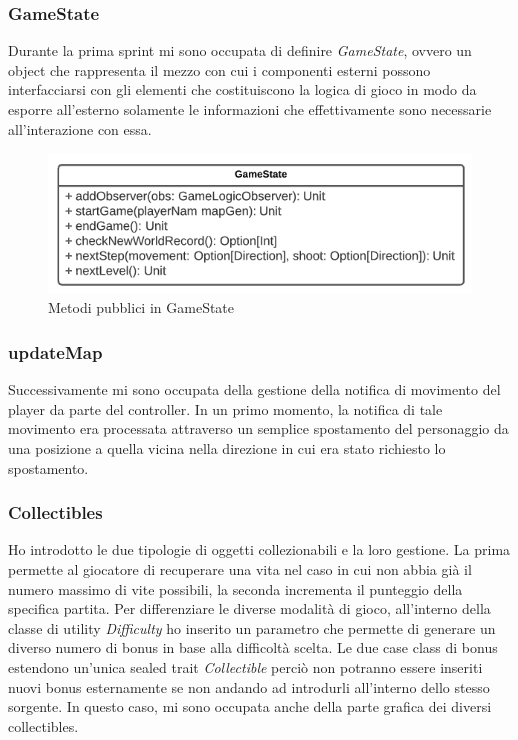 
\subsubsection{GameState}

Durante la prima sprint mi sono occupata di definire \textit{GameState}, ovvero un object che rappresenta il mezzo con cui i componenti esterni possono interfacciarsi con gli elementi che costituiscono la logica di gioco in modo da esporre all'esterno solamente le informazioni che effettivamente sono necessarie all'interazione con essa.
    \begin{figure}[H]\centering
      \includegraphics[width=12cm]{res/GameState-uml.png}
      \caption{Metodi pubblici in GameState}
      \label{gameState}
    \end{figure}


\subsubsection{updateMap}

Successivamente mi sono occupata della gestione della notifica di movimento del player da parte del controller. In un primo momento, la notifica di tale movimento era processata attraverso un semplice spostamento del personaggio da una posizione a quella vicina nella direzione in cui era stato richiesto lo spostamento.


\subsubsection{Collectibles}

Ho introdotto le due tipologie di oggetti collezionabili e la loro gestione. La prima permette al giocatore di recuperare una vita nel caso in cui non abbia già il numero massimo di vite possibili, la seconda incrementa il punteggio della specifica partita.
Per differenziare le diverse modalità di gioco, all'interno della classe di utility \textit{Difficulty} ho inserito un parametro che permette di generare un diverso numero di bonus in base alla difficoltà scelta.
Le due case class di bonus estendono un'unica sealed trait \textit{Collectible} perciò non potranno essere inseriti nuovi bonus esternamente se non andando ad introdurli all'interno dello stesso sorgente.
In questo caso, mi sono occupata anche della parte grafica dei diversi collectibles. 


